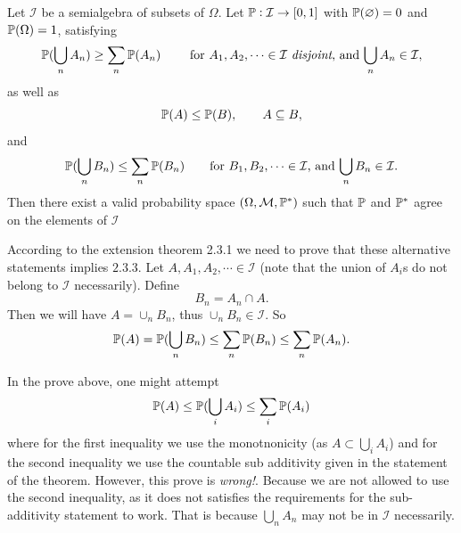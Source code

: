 \begin{problem}
	Let $ \mathcal{I} $ be a semialgebra of subsets of $ \Omega $. Let $ \mathbb{P}:\mathcal{I}\to [0,1] $ with $ \mathbb{P}(\varnothing) = 0 $ and $ \mathbb{P}(\Omega) = 1 $, satisfying 
	\[ \prob(\bigcup_n A_n) \geq \sum_n \prob(A_n)\ \qquad \text{for $ A_1,A_2,\cdots \in \mathcal{I} $ \emph{disjoint}, and $ \bigcup_n A_n \in \mathcal{I} $}, \]
	as well as 
	\[ \mathbb{P}(A) \leq \mathbb{P}(B), \qquad A \subseteq B, \]
	and
	\[ \mathbb{P}(\bigcup_n B_n) \leq \sum_n \mathbb{P}(B_n) \qquad \text{for $ B_1,B_2,\cdots \in \mathcal{I} $, and $ \bigcup_n B_n \in \mathcal{I} $}.\]
	Then there exist a valid probability space $ (\Omega, \mathcal{M},\mathbb{P}^*) $ such that $ \mathbb{P} $ and $ \mathbb{P}^* $ agree on the elements of $ \mathcal{I} $
\end{problem}
\begin{solution}
	According to the extension theorem 2.3.1 we need to prove that these alternative statements implies $ 2.3.3 $. Let $ A, A_1,A_2,\cdots \in \mathcal{I} $ (note that the union of $ A_i $s do not belong to $ \mathcal{I} $ necessarily). Define
	\[ B_n = A_n \cap A. \]
	Then we will have $ A = \cup_n B_n $, thus $ \cup_n B_n \in \mathcal{I} $. So
	\[ \mathbb{P}(A) = \mathbb{P}(\bigcup_n B_n) \leq \sum_n \mathbb{P}(B_n) \leq \sum_n \mathbb{P}(A_n). \]
\end{solution}
\begin{observation}
	In the prove above, one might attempt 
	\[ \mathbb{P}(A) \leq \mathbb{P}(\bigcup_i A_i) \leq \sum_i \mathbb{P}(A_i) \]
	where for the first inequality we use the monotnonicity (as $ A \subset \bigcup_i A_i $) and for the second inequality we use the countable sub additivity given in the statement of the theorem. However, this prove is \emph{wrong!}. Because we are not allowed to use the second inequality, as it does not satisfies the requirements for the sub-additivity statement to work. That is because $ \bigcup_n A_n $ may not be in $ \mathcal{I} $ necessarily.
\end{observation}

